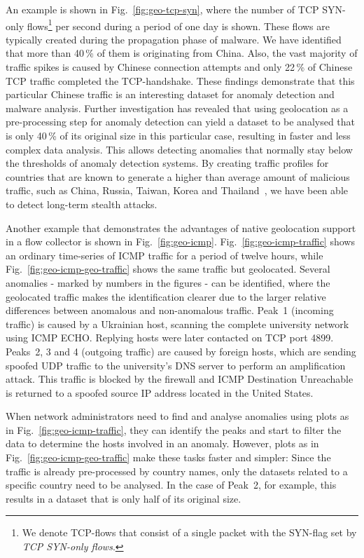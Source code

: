An example is shown in Fig.~\ref{fig:geo-tcp-syn}, where the number of TCP SYN-only flows\footnote{We denote TCP-flows that consist of a single packet with the SYN-flag set by \textit{TCP SYN-only flows}.} per second during a period of one day is shown. These flows are typically created during the propagation phase of malware. We have identified that more than 40\,\% of them is originating from China. Also, the vast majority of traffic spikes is caused by Chinese connection attempts and only 22\,\% of Chinese TCP traffic completed the TCP-handshake. These findings demonstrate that this particular Chinese traffic is an interesting dataset for anomaly detection and malware analysis. Further investigation has revealed that using geolocation as a pre-processing step for anomaly detection can yield a dataset to be analysed that is only 40\,\% of its original size in this particular case, resulting in faster and less complex data analysis. This allows detecting anomalies that normally stay below the thresholds of anomaly detection systems. By creating traffic profiles for countries that are known to generate a higher than average amount of malicious traffic, such as China, Russia, Taiwan, Korea and Thailand~\cite{vanPolen-2011-Finding}, we have been able to detect long-term stealth attacks.

Another example that demonstrates the advantages of native geolocation support in a flow collector is shown in Fig.~\ref{fig:geo-icmp}. Fig.~\ref{fig:geo-icmp-traffic} shows an ordinary time-series of ICMP traffic for a period of twelve hours, while Fig.~\ref{fig:geo-icmp-geo-traffic} shows the same traffic but geolocated. Several anomalies - marked by numbers in the figures - can be identified, where the geolocated traffic makes the identification clearer due to the larger relative differences between anomalous and non-anomalous traffic. Peak~1 (incoming traffic) is caused by a Ukrainian host, scanning the complete university network using ICMP ECHO. Replying hosts were later contacted on TCP port 4899. Peaks~2, 3 and 4 (outgoing traffic) are caused by foreign hosts, which are sending spoofed UDP traffic to the university's DNS server to perform an amplification attack. This traffic is blocked by the firewall and ICMP Destination Unreachable is returned to a spoofed source IP address located in the United States.

When network administrators need to find and analyse anomalies using plots as in Fig.~\ref{fig:geo-icmp-traffic}, they can identify the peaks and start to filter the data to determine the hosts involved in an anomaly. However, plots as in Fig.~\ref{fig:geo-icmp-geo-traffic} make these tasks faster and simpler: Since the traffic is already pre-processed by country names, only the datasets related to a specific country need to be analysed. In the case of Peak~2, for example, this results in a dataset that is only half of its original size.

